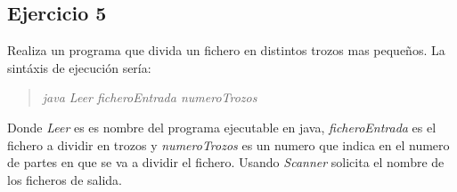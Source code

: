 \documentclass[a4paper,spanish]{article}
\begin{document}
\subsection*{Ejercicio 5}
Realiza un programa que divida un fichero en distintos trozos mas pequeños. La sintáxis de ejecución sería:
\begin{quote}
\emph{java Leer ficheroEntrada numeroTrozos}
\end{quote}
Donde \emph{Leer} es es nombre del programa ejecutable en java, \emph{ficheroEntrada} es el fichero a dividir en trozos y \emph{numeroTrozos} es un numero que indica en el numero de partes en que se va a dividir el fichero. Usando \emph{Scanner} solicita el nombre de los ficheros de salida.
\end{document}
